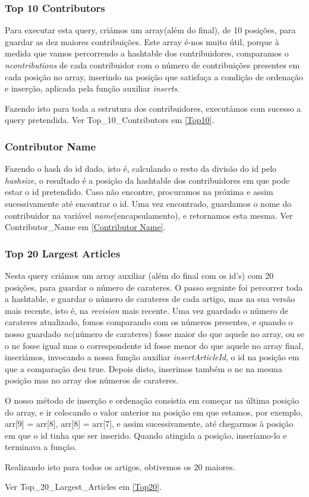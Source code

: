\documentclass{article}
\begin{document}
\subsubsection{Top 10 Contributors}
\par Para executar esta query, criámos um array(além do final), de 10 posições, para guardar as dez maiores contribuições. Este array é-nos muito útil, porque à medida que vamos percorrendo a hashtable dos contribuidores, comparamos o \emph{ncontributions} de cada contribuidor com o número de contribuições presentes em cada posição no array, inserindo na posição que satisfaça a condição de ordenação e inserção, aplicada pela função auxiliar \emph{inserts}. \par Fazendo isto para toda a estrutura dos contribuidores, executámos com sucesso a query pretendida. Ver Top\_10\_Contributors em \ref{Top10}.

\subsubsection{Contributor Name}
\par Fazendo o hash do id dado, isto é, calculando o resto da divisão do id pelo \emph{hashsize}, o resultado é a posição da hashtable dos contribuidores em que pode estar o id pretendido. Caso não encontre, procuramos na próxima e assim sucessivamente até encontrar o id. Uma vez encontrado, guardamos o nome do contribuidor na variável \emph{name}(encapsulamento), e retornamos esta mesma. Ver Contributor\_Name em \ref{Contributor Name}.

\subsubsection{Top 20 Largest Articles}
\par Nesta query criámos um array auxiliar (além do final com os id's) com 20 posições, para guardar o número de carateres. O passo seguinte foi percorrer toda a hashtable, e guardar o número de carateres de cada artigo, mas na sua versão mais recente, isto é, na \emph{revision} mais recente. Uma vez guardado o número de carateres atualizado, fomos comparando com os números presentes, e quando o nosso guardado \emph{nc}(número de carateres) fosse maior do que aquele no array, ou se o nc fosse igual mas o correspondente id fosse menor do que aquele no array final, inseriámos, invocando a nossa função auxiliar \emph{insertArticleId}, o id na posição em que a comparação deu true. Depois disto, inserimos também o nc na mesma posição mas no array dos números de carateres. \par O nosso método de inserção e ordenação consistia em começar na última posição do array, e ir colocando o valor anterior na posição em que estamos, por exemplo, arr[9] = arr[8], arr[8] = arr[7], e assim sucessivamente, até chegarmos à posição em que o id tinha que ser inserido. Quando atingida a posição, inseríamo-lo e terminava a função. \par Realizando isto para todos os artigos, obtivemos os 20 maiores.
\par Ver Top\_20\_Largest\_Articles em \ref{Top20}.
\end{document}
